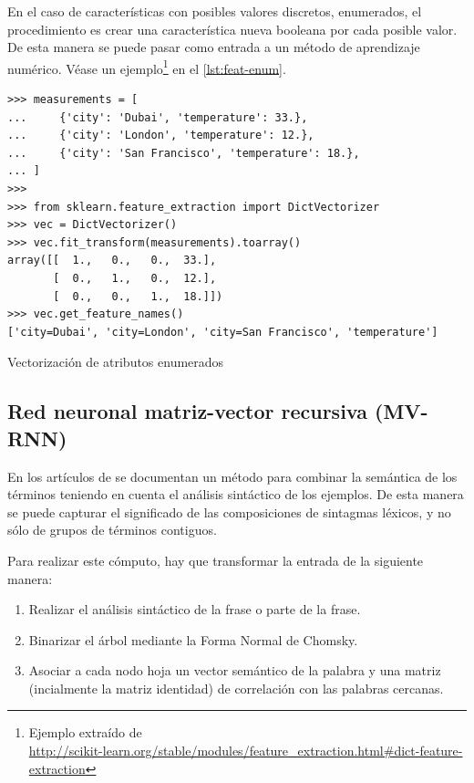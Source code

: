 En el caso de características con posibles valores discretos, enumerados, el procedimiento es crear una característica nueva booleana por cada posible valor. De esta manera se puede pasar como entrada a un método de aprendizaje numérico. Véase un ejemplo\footnote{Ejemplo extraído de\\
\url{http://scikit-learn.org/stable/modules/feature_extraction.html\#dict-feature-extraction}} en el \autoref{lst:feat-enum}.

\begin{listing}[htbp]
\begin{verbatim}
>>> measurements = [
...     {'city': 'Dubai', 'temperature': 33.},
...     {'city': 'London', 'temperature': 12.},
...     {'city': 'San Francisco', 'temperature': 18.},
... ]
>>> 
>>> from sklearn.feature_extraction import DictVectorizer
>>> vec = DictVectorizer()
>>> vec.fit_transform(measurements).toarray()
array([[  1.,   0.,   0.,  33.],
       [  0.,   1.,   0.,  12.],
       [  0.,   0.,   1.,  18.]])
>>> vec.get_feature_names()
['city=Dubai', 'city=London', 'city=San Francisco', 'temperature']
\end{verbatim}
\caption{Vectorización de atributos enumerados}
\label{lst:feat-enum}
\end{listing}


\subsection{Red neuronal matriz-vector recursiva (MV-RNN)} 

En los artículos de \citet{Socher2012,Socher2013} se documentan un método para combinar la semántica de los términos teniendo en cuenta el análisis sintáctico de los ejemplos. De esta manera se puede capturar el significado de las composiciones de sintagmas léxicos, y no sólo de grupos de términos contiguos.

Para realizar este cómputo, hay que transformar la entrada de la siguiente manera:
\nopagebreak
\begin{enumerate}
\item Realizar el análisis sintáctico de la frase o parte de la frase.
\item Binarizar el árbol mediante la Forma Normal de Chomsky.
\item Asociar a cada nodo hoja un vector semántico de la palabra y una matriz (incialmente la matriz identidad) de correlación con las palabras cercanas.
\end{enumerate}

